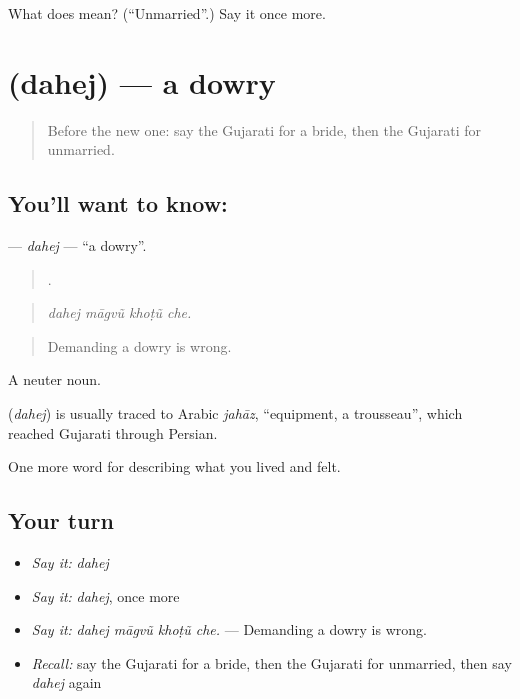 \begin{tcolorbox}[breakable,colback=teal!4,colframe=teal!35!black,title={Before you move on}]
What does  mean? (\textquotedblleft{}Unmarried\textquotedblright{}.) Say it once more.
\end{tcolorbox}
\section[\texorpdfstring{\gu{દહેજ} (dahej)}{દહેજ (dahej)}]{ (dahej) — a dowry}

\label{lesson:GU-C498-dahej}



\begin{quote}
Before the new one: say the Gujarati for a bride, then the Gujarati for unmarried.
\end{quote}

\subsection*{You'll want to know: }
\textbf{} — \emph{dahej} — \textquotedblleft{}a dowry\textquotedblright{}.

\begin{quote}
   .
\end{quote}

\begin{quote}
\emph{dahej māgvũ khoṭũ che.}
\end{quote}

\begin{quote}
Demanding a dowry is wrong.
\end{quote}

A neuter noun.

\begin{cousinweb}
\textbf{} (\emph{dahej}) is usually traced to Arabic \emph{jahāz}, \textquotedblleft{}equipment, a trousseau\textquotedblright{}, which reached Gujarati through Persian.
\end{cousinweb}

\begin{grammarlens}[title={What you've built}]
One more word for describing what you lived and felt.
\end{grammarlens}

\subsection*{Your turn}
\begin{itemize}
\raggedright
  \item \emph{Say it:} \emph{dahej}
  \item \emph{Say it:} \emph{dahej}, once more
  \item \emph{Say it:} \emph{dahej māgvũ khoṭũ che.} — Demanding a dowry is wrong.
  \item \emph{Recall:} say the Gujarati for a bride, then the Gujarati for unmarried, then say \emph{dahej} again
\end{itemize}

